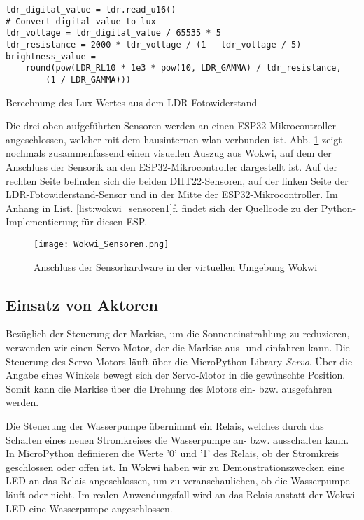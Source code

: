 \begin{listing}[!ht]
    \begin{verbatim}
ldr_digital_value = ldr.read_u16()
# Convert digital value to lux
ldr_voltage = ldr_digital_value / 65535 * 5
ldr_resistance = 2000 * ldr_voltage / (1 - ldr_voltage / 5)
brightness_value = 
    round(pow(LDR_RL10 * 1e3 * pow(10, LDR_GAMMA) / ldr_resistance, 
        (1 / LDR_GAMMA)))
\end{verbatim}
    \caption{Berechnung des Lux-Wertes aus dem LDR-Fotowiderstand}
    \label{list:LDR_Berechnung}
\end{listing}

Die drei oben aufgeführten Sensoren werden an einen ESP32-Mikrocontroller angeschlossen, welcher mit dem hausinternen \gls{wlan} verbunden ist. Abb. \ref{fig:wokwi_sensoren} zeigt nochmals zusammenfassend einen visuellen Auszug aus Wokwi, auf dem der Anschluss der Sensorik an den ESP32-Mikrocontroller dargestellt ist. Auf der rechten Seite befinden sich die beiden DHT22-Sensoren, auf der linken Seite der LDR-Fotowiderstand-Sensor und in der Mitte der ESP32-Mikrocontroller. Im Anhang in List. \ref{list:wokwi_sensoren1}f. findet sich der Quellcode zu der Python-Implementierung für diesen ESP.

\begin{figure}[h]
    \centering
    \texttt{[image: Wokwi\_Sensoren.png]}
    \caption{Anschluss der Sensorhardware in der virtuellen Umgebung Wokwi}\label{fig:wokwi_sensoren}
\end{figure}

\subsection{Einsatz von Aktoren}
Bezüglich der Steuerung der Markise, um die Sonneneinstrahlung zu reduzieren, verwenden wir einen Servo-Motor, der die Markise aus- und einfahren kann. Die Steuerung des Servo-Motors läuft über die MicroPython Library \textit{Servo}. Über die Angabe eines Winkels bewegt sich der Servo-Motor in die gewünschte Position. Somit kann die Markise über die Drehung des Motors ein- bzw. ausgefahren werden.

Die Steuerung der Wasserpumpe übernimmt ein Relais, welches durch das Schalten eines neuen Stromkreises die Wasserpumpe an- bzw. ausschalten kann. In MicroPython definieren die Werte '0' und '1' des Relais, ob der Stromkreis geschlossen oder offen ist. In Wokwi haben wir zu Demonstrationszwecken eine LED an das Relais angeschlossen, um zu veranschaulichen, ob die Wasserpumpe läuft oder nicht. Im realen Anwendungsfall wird an das Relais anstatt der Wokwi-LED eine Wasserpumpe angeschlossen.

